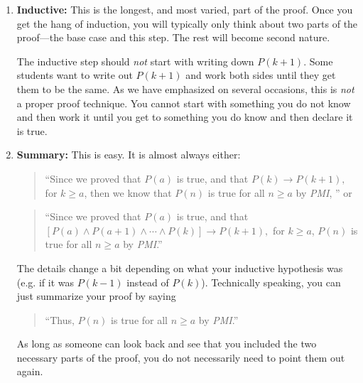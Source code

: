 \begin{enumerate}
The goal does not need to be written down and is not really part of the proof.  The 
only purpose of doing so it to help you see what you need to do in the next step. 
For instance, knowing the goal often helps you to figure out the required algebra steps to get there.


\item{\bf Inductive:} 
This is the longest, and most varied, part of the proof.
Once you get the hang of induction, you will typically only think about two parts of the 
proof---the base case and this step.  The rest will become second nature.

The inductive step should {\em not} start with writing down $P(k+1)$.
Some students want to write out $P(k+1)$ and
work both sides until they get them to be the same.  
As we have emphasized on several occasions, this is {\em not} a proper
proof technique.  You cannot start with something you do not know and then work it until
you get to something you do know and then declare it is true.  
\item{\bf Summary:} 
This is easy.  It is almost always either:
\begin{quote}
``Since we proved that $P(a)$ is true, and that
$P(k)\rightarrow P(k+1),$ for $k\geq a$, 
then we know that $P(n)$ is true for all $n\geq a$ by {\em PMI}, '' or
\end{quote}
\begin{quote}
``Since we proved that $P(a)$ is true, and that
$[P(a)\wedge P(a+1)\wedge\cdots\wedge P(k)]\rightarrow P(k+1),$ for $k\geq a$, 
$P(n)$ is true for all $n\geq a$ by {\em PMI}.''
\end{quote}
The details change a bit depending on what your inductive hypothesis was
(e.g. if it was $P(k-1)$ instead of $P(k)$).
Technically speaking, you can just summarize your proof by saying
\begin{quote}
``Thus, $P(n)$ is true for all $n\geq a$ by {\em PMI}.''
\end{quote}
As long as someone can look back and see that you included the two necessary parts of the
proof, you do not necessarily need to point them out again. 
\end{enumerate}

